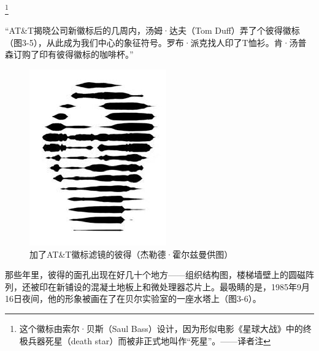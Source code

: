 \documentclass[a4paper,12pt,UTF8,twoside]{ctexbook}
\begin{document}
\footnote{这个徽标由索尔·贝斯（Saul Bass）设计，因为形似电影《星球大战》中的终极兵器死星（death star）而被非正式地叫作“死星”。——译者注}

“AT\&T揭晓公司新徽标后的几周内，汤姆·达夫（Tom Duff）弄了个彼得徽标（图3-5），从此成为我们中心的象征符号。罗布·派克找人印了T恤衫。肯·汤普森订购了印有彼得徽标的咖啡杯。”

\begin{figure}[htbp]
	\centering
	\includegraphics[width=0.7\linewidth]{23}
	\caption{加了AT\&T徽标滤镜的彼得（杰勒德·霍尔兹曼供图）}
	\label{fig:1}
\end{figure}

那些年里，彼得的面孔出现在好几十个地方——组织结构图，楼梯墙壁上的圆磁阵列，还被印在新铺设的混凝土地板上和微处理器芯片上。最吸睛的是，1985年9月16日夜间，他的形象被画在了在贝尔实验室的一座水塔上（图3-6）。
\end{document}

